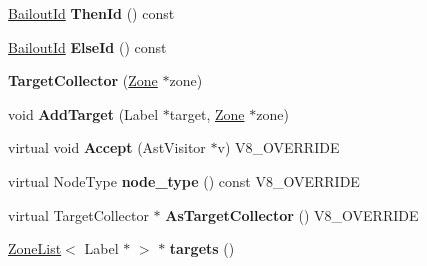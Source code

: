 \begin{DoxyCompactItemize}
\item 
\hypertarget{classv8_1_1internal_1_1_v8___f_i_n_a_l_ac078edb5541a16f09b578027c21a7cc2}{}\hyperlink{classv8_1_1internal_1_1_bailout_id}{Bailout\+Id} {\bfseries Then\+Id} () const \label{classv8_1_1internal_1_1_v8___f_i_n_a_l_ac078edb5541a16f09b578027c21a7cc2}

\item 
\hypertarget{classv8_1_1internal_1_1_v8___f_i_n_a_l_afe1f16edfb6d4a276a8ca25e6673d885}{}\hyperlink{classv8_1_1internal_1_1_bailout_id}{Bailout\+Id} {\bfseries Else\+Id} () const \label{classv8_1_1internal_1_1_v8___f_i_n_a_l_afe1f16edfb6d4a276a8ca25e6673d885}

\item 
\hypertarget{classv8_1_1internal_1_1_v8___f_i_n_a_l_ab025ee9258e453c7a7c337de26732385}{}{\bfseries Target\+Collector} (\hyperlink{classv8_1_1internal_1_1_zone}{Zone} $\ast$zone)\label{classv8_1_1internal_1_1_v8___f_i_n_a_l_ab025ee9258e453c7a7c337de26732385}

\item 
\hypertarget{classv8_1_1internal_1_1_v8___f_i_n_a_l_afa83d81099e1dce1c81440d68197539f}{}void {\bfseries Add\+Target} (Label $\ast$target, \hyperlink{classv8_1_1internal_1_1_zone}{Zone} $\ast$zone)\label{classv8_1_1internal_1_1_v8___f_i_n_a_l_afa83d81099e1dce1c81440d68197539f}

\item 
\hypertarget{classv8_1_1internal_1_1_v8___f_i_n_a_l_ad2aa741f4a85efbc96ddbf37c88b8d55}{}virtual void {\bfseries Accept} (Ast\+Visitor $\ast$v) V8\+\_\+\+O\+V\+E\+R\+R\+I\+D\+E\label{classv8_1_1internal_1_1_v8___f_i_n_a_l_ad2aa741f4a85efbc96ddbf37c88b8d55}

\item 
\hypertarget{classv8_1_1internal_1_1_v8___f_i_n_a_l_a695aa9b24e6d0560de876d04380df114}{}virtual Node\+Type {\bfseries node\+\_\+type} () const V8\+\_\+\+O\+V\+E\+R\+R\+I\+D\+E\label{classv8_1_1internal_1_1_v8___f_i_n_a_l_a695aa9b24e6d0560de876d04380df114}

\item 
\hypertarget{classv8_1_1internal_1_1_v8___f_i_n_a_l_af0776705c5e2ecd9e3160f0f919807de}{}virtual Target\+Collector $\ast$ {\bfseries As\+Target\+Collector} () V8\+\_\+\+O\+V\+E\+R\+R\+I\+D\+E\label{classv8_1_1internal_1_1_v8___f_i_n_a_l_af0776705c5e2ecd9e3160f0f919807de}

\item 
\hypertarget{classv8_1_1internal_1_1_v8___f_i_n_a_l_ae99121915b172fd0c67fb4f1f48ae3de}{}\hyperlink{classv8_1_1internal_1_1_zone_list}{Zone\+List}$<$ Label $\ast$ $>$ $\ast$ {\bfseries targets} ()\label{classv8_1_1internal_1_1_v8___f_i_n_a_l_ae99121915b172fd0c67fb4f1f48ae3de}


\end{DoxyCompactItemize}
